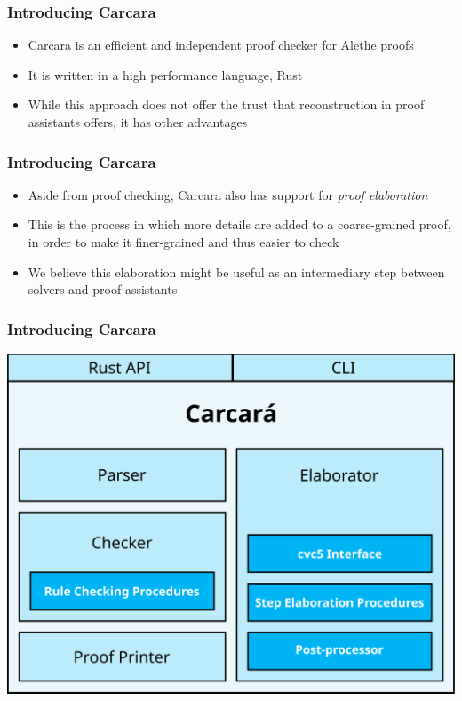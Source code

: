 \documentclass[usepdftitle=false,aspectratio=169]{beamer}
\newcommand\vitem{\vfill\item}
\begin{document}
\begin{frame}
  \frametitle{Introducing Carcara}
  \begin{itemize}
    \vitem Carcara is an efficient and independent proof checker for Alethe
    proofs
    \vitem It is written in a high performance language, Rust
    \vitem While this approach does not offer the trust that reconstruction in
    proof assistants offers, it has other advantages
  \end{itemize}
\end{frame}

\begin{frame}
  \frametitle{Introducing Carcara}
  \begin{itemize}
    \vitem Aside from proof checking, Carcara also has support for \emph{proof
    elaboration}
    \vitem This is the process in which more details are added to a
    coarse-grained proof, in order to make it finer-grained and thus easier to
    check
    \vitem We believe this elaboration might be useful as an intermediary step
    between solvers and proof assistants
  \end{itemize}
\end{frame}

\begin{frame}
  \frametitle{Introducing Carcara}
  \centering
  \includegraphics[height=0.8\textheight]{images/architecture.png}
\end{frame}
\end{document}
